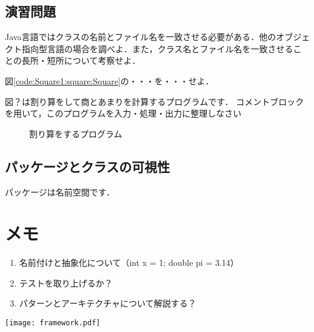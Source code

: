 \documentclass[a4j,papersize]{jsbook}
\begin{document}
\section{演習問題}

\begin{演習}
 Java言語ではクラスの名前とファイル名を一致させる必要がある．他のオブジェ
 クト指向型言語の場合を調べよ．また，クラス名とファイル名を一致させるこ
 との長所・短所について考察せよ．
\end{演習}

\begin{演習}
 図\ref{code:Square1:square:Square}の・・・を・・・せよ．
\end{演習}

\begin{演習}
 図？は割り算をして商とあまりを計算するプログラムです．
 コメントブロックを用いて，このプログラムを入力・処理・出力に整理しなさい
 \end{演習}
 
\begin{figure}

\caption{割り算をするプログラム} 
\end{figure}

\section{パッケージとクラスの可視性}
パッケージは名前空間です．

\chapter{メモ}

\begin{enumerate}
 \item 名前付けと抽象化について（int x = 1; double pi = 3.14）
 \item テストを取り上げるか？
 \item パターンとアーキテクチャについて解説する？
\end{enumerate}

\texttt{[image: framework.pdf]}
\end{document}
